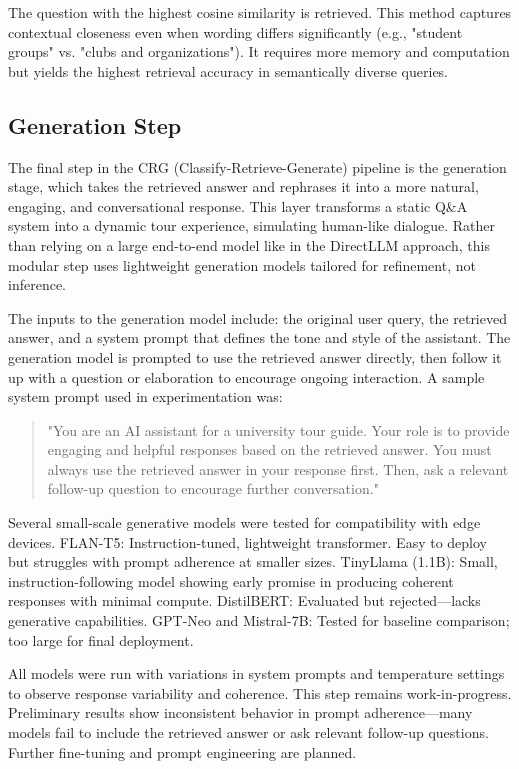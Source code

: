 \documentclass[conference]{IEEEtran}
\begin{document}
The question with the highest cosine similarity is retrieved. 
This method captures contextual closeness even when wording differs significantly (e.g., "student groups" vs. "clubs and organizations"). 
It requires more memory and computation but yields the highest retrieval accuracy in semantically diverse queries.

\subsection{Generation Step}
The final step in the CRG (Classify-Retrieve-Generate) pipeline is the generation stage, which takes the retrieved answer and rephrases it into a more natural, engaging, and conversational response. 
This layer transforms a static Q\&A system into a dynamic tour experience, simulating human-like dialogue. 
Rather than relying on a large end-to-end model like in the DirectLLM approach, this modular step uses lightweight generation models tailored for refinement, not inference.

The inputs to the generation model include: the original user query, the retrieved answer, and a system prompt that defines the tone and style of the assistant.
The generation model is prompted to use the retrieved answer directly, then follow it up with a question or elaboration to encourage ongoing interaction. 
A sample system prompt used in experimentation was:

\begin{quote}
    "You are an AI assistant for a university tour guide. 
    Your role is to provide engaging and helpful responses based on the retrieved answer. 
    You must always use the retrieved answer in your response first. 
    Then, ask a relevant follow-up question to encourage further conversation."
\end{quote}

Several small-scale generative models were tested for compatibility with edge devices.
FLAN-T5: Instruction-tuned, lightweight transformer. Easy to deploy but struggles with prompt adherence at smaller sizes.
TinyLlama (1.1B): Small, instruction-following model showing early promise in producing coherent responses with minimal compute.
DistilBERT: Evaluated but rejected—lacks generative capabilities.
GPT-Neo and Mistral-7B: Tested for baseline comparison; too large for final deployment.

All models were run with variations in system prompts and temperature settings to observe response variability and coherence.
This step remains work-in-progress. 
Preliminary results show inconsistent behavior in prompt adherence—many models fail to include the retrieved answer or ask relevant follow-up questions. 
Further fine-tuning and prompt engineering are planned.
\end{document}
